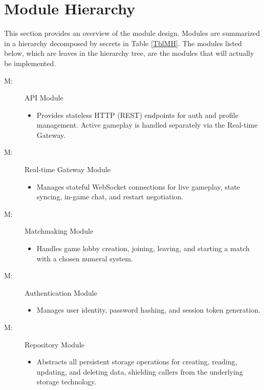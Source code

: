 \documentclass[12pt, titlepage]{article}
\newcounter{mnum}
\newcommand{\mthemnum}{M\themnum}
\begin{document}
\newpage

\section{Module Hierarchy} \label{SecMH}

This section provides an overview of the module design. Modules are summarized
in a hierarchy decomposed by secrets in Table \ref{TblMH}. The modules listed
below, which are leaves in the hierarchy tree, are the modules that will
actually be implemented.


\begin{description}
\item [ \mthemnum \label{mAPI}:] API Module
    \begin{itemize}
        \item Provides stateless HTTP (REST) endpoints for auth and profile management. Active gameplay is handled separately via the Real-time Gateway.
    \end{itemize}

\item [ \mthemnum \label{mRealtimeGateway}:] Real-time Gateway Module
    \begin{itemize}
        \item Manages stateful WebSocket connections for live gameplay, state syncing, in-game chat, and restart negotiation.
    \end{itemize}

\item [ \mthemnum \label{mMatchmaking}:] Matchmaking Module
    \begin{itemize}
        \item Handles game lobby creation, joining, leaving, and starting a match with a chosen numeral system.
    \end{itemize}

\item [ \mthemnum \label{mAuth}:] Authentication Module
    \begin{itemize}
        \item Manages user identity, password hashing, and session token generation.
    \end{itemize}

\item [ \mthemnum \label{mRepository}:] Repository Module
    \begin{itemize}
        \item Abstracts all persistent storage operations for creating, reading, updating, and deleting data, shielding callers from the underlying storage technology.
    \end{itemize}


\end{description}
\end{document}
